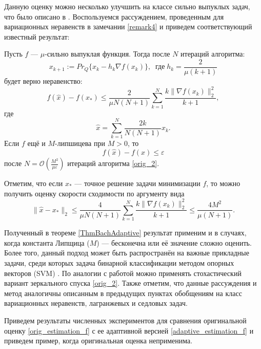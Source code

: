 Данную оценку можно несколько улучшить на классе сильно выпуклых задач, что было описано в \cite{Stonyakin_2021}. Воспользуемся рассуждением, проведенным для вариационных неравенств в замечании \ref{remark4} и приведем соответствующий известный результат:
\begin{theorem}\label{ThmBachAdaptive}
    Пусть $f$ --- $\mu$-сильно выпуклая функция. Тогда после $N$ итераций алгоритма:
    \begin{equation}\label{orig_2}
        x_{k+1} := Pr_{Q}\{x_k - h_k \nabla f(x_k) \}, \;\; \textit{где} \; h_k = \frac{2}{\mu (k+1)}
    \end{equation}
    будет верно неравенство:
    \begin{equation}\label{adaptive_estimation_f}
        f(\widehat{x}) - f(x_*) \leq \frac{2}{\mu N (N+1)} \sum_{k=1}^{N} \frac{k \|\nabla f(x_k)\|_2^2}{k+1},
    \end{equation}
    где
    $$
        \widehat{x} = \sum_{k=1}^{N} \frac{2 k}{N (N+1)} x_k.
    $$
    Если $f$ ещё и $M$-липшицева при $M >0$, то
    $$
         f(\widehat{x}) - f(x) \leq \varepsilon
    $$
    после $N = \mathcal{O}(\frac{M^2}{\mu\varepsilon})$ итераций алгоритма \eqref{orig_2}.
\end{theorem}

Отметим, что если $x_*$ --- точное решение задачи минимизации $f$, то можно получить оценку скорости сходимости по аргументу вида
\begin{equation} \label{arg_est}
    \|\widehat{x} - x_*\|_2 \leq \frac{4}{\mu N (N+1)} \sum_{k=1}^{N} \frac{k \|\nabla f(x_k)\|_2^2}{k+1} \leq \frac{4M^2}{\mu(N+1)}.
\end{equation}

Полученный в теореме \ref{ThmBachAdaptive} результат применим и в случаях, когда константа Липщица ($M$) --- бесконечна или её значение сложно оценить. Более того, данный подход может быть распространён на важные прикладные задачи, среди которых задача бинарной классификации методом опорных векторов (SVM) \cite{Bach_2012}. По аналогии с работой \cite{Bach_2012} можно применять стохастический вариант зеркального спуска \eqref{orig_2}. Также отметим, что данные рассуждения и метод аналогичны описанным в предыдущих пунктах обобщениям на класс вариационных неравенств, лагранжевых и седловых задач. 

Приведем результаты численных экспериментов для сравнения оригинальной оценку \eqref{orig_estimation_f} с ее адаптивной версией \eqref{adaptive_estimation_f} и приведем пример, когда оригинальная оценка неприменима. 

